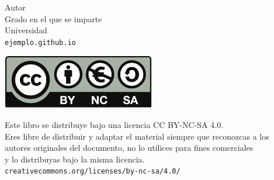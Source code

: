 \documentclass[10pt, a4paper]{article}
\theoremstyle{theorem-style}
\theoremstyle{definition-style}
\theoremstyle{remark-style}
\theoremstyle{example-style}
\theoremstyle{definition-style}
\theoremstyle{remark-style}
\begin{document}

\afterpage{\restorepagecolor} %
\begin{titlepage}

	\parbox[t]{\textwidth}{
			\raggedright %
			\fontsize{50pt}{50pt}\selectfont\sffamily{}
	}

	\vfill

	\parbox[t]{\textwidth}{
		\raggedright %
		\sffamily\large\color{white}
		{\Large Autor}\\[4pt]
		Grado en el que se imparte\\
		Universidad\\[4pt]
		\texttt{ejemplo.github.io}
	}

\end{titlepage}


\thispagestyle{empty}
\null
\vfill

\parbox[t]{\textwidth}{
  \includegraphics{by-nc-sa.pdf}\\[4pt]
  \raggedright %
  \sffamily\large
  {\Large Este libro se distribuye bajo una licencia CC BY-NC-SA 4.0.}\\[4pt]
  Eres libre de distribuir y adaptar el material siempre que reconozcas a los\\
  autores originales del documento, no lo utilices para fines comerciales\\
  y lo distribuyas bajo la misma licencia.\\[4pt]
  \texttt{creativecommons.org/licenses/by-nc-sa/4.0/}
}
\end{document}
